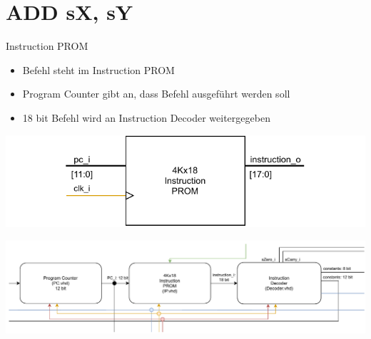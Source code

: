 \documentclass[10pt, t,
aspectratio=169,%
usenames,
dvipsnames,
]{beamer}
\begin{document}
	\section{ADD sX, sY}
	\begin{frame}{Instruction PROM}
		\begin{multicols}{2}
		\begin{itemize}
			\item Befehl steht im Instruction PROM
			\item Program Counter gibt an, dass Befehl ausgeführt werden soll
			\item 18 bit Befehl wird an Instruction Decoder weitergegeben
		\end{itemize}
		\includegraphics[width=\linewidth]{../Blockbeschreibungen/IP_beschreibung.pdf}
		\end{multicols}
		\includegraphics[width=\linewidth]{../Blockbeschreibungen/PC-IDBlockdiagramSnipits.pdf}
	\end{frame}
\end{document}
